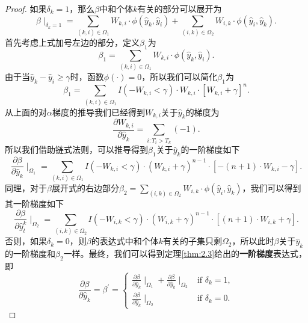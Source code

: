 \begin{proof}
如果$\delta_k = 1$，那么$\beta$中和个体$k$有关的部分可以展开为$$\beta \mid_{\delta_k=1}=\sum_{(k,i)\in \Omega_1} W_{k,i}\cdot \phi(\hat{y}_k, \hat{y}_i) + \sum_{(i,k)\in \Omega_2} W_{i,k}\cdot \phi(\hat{y}_i, \hat{y}_k) .$$ 首先考虑上式加号左边的部分，定义$\beta_1$为$$\beta_1 = \sum_{(k,i)\in \Omega_1} W_{k,i}\cdot \phi(\hat{y}_k, \hat{y}_i).$$ 由于当$\hat{y}_k - \hat{y}_i \ge \gamma$时，函数$\phi(\cdot)=0$，所以我们可以简化$\beta_1$为$$\beta_1 = \sum_{(k,i)\in \Omega_1} I(-W_{k,i} < \gamma) \cdot W_{k,i}\cdot [W_{k,i} + \gamma]^n .$$ 从上面的对$\alpha$梯度的推导我们已经得到$W_{k,i}$关于$\hat{y}_k$的梯度为$$\frac{\partial W_{k,i}}{\partial \hat{y}_k} = \sum\limits_{i: T_i>T_k}(-1).$$ 所以我们借助链式法则，可以推导得到$\beta_1$关于$\hat{y}_k$的一阶梯度如下$$
\frac{\partial \beta}{\partial \hat{y}_k} \mid_{\Omega_1} = \sum\limits_{(k,i)\in \Omega_1} {I(-W_{k,i}<\gamma)\cdot (W_{k,i}+\gamma)^{n-1}\cdot [-(n+1)\cdot W_{k,i}-\gamma]}.
$$ 同理，对于$\beta$展开式的右边部分$\beta_2=\sum_{(i,k)\in \Omega_2} W_{i,k}\cdot \phi(\hat{y}_i, \hat{y}_k)$，我们可以得到其一阶梯度如下$$
\frac{\partial \beta}{\partial \hat{y}_t^k} \mid_{\Omega_2} = \sum\limits_{(i,k)\in \Omega_2} {I(-W_{i,k}<\gamma)\cdot (W_{i,k}+\gamma)^{n-1}\cdot [(n+1)\cdot W_{i,k}+\gamma]}.
$$ 否则，如果$\delta_k = 0$，则$\beta$的表达式中和个体$k$有关的子集只剩$\Omega_2$，所以此时$\beta$关于$\hat{y}_k$的一阶梯度和$\beta_2$一样。最终，我们可以得到定理\ref{thm:2.3}给出的\textbf{一阶梯度}表达式，即$$
\frac{\partial \beta}{\partial \hat{y}_k}=\beta^{'}=
\begin{cases}
\frac{\partial \beta}{\partial \hat{y}_k} \mid_{\Omega_1} + \frac{\partial \beta}{\partial \hat{y}_k} \mid_{\Omega_2} & \text{if } \delta_k = 1,\\
\frac{\partial \beta}{\partial \hat{y}_k} \mid_{\Omega_2} & \text{if } \delta_k = 0.
\end{cases}
$$
\end{proof}

